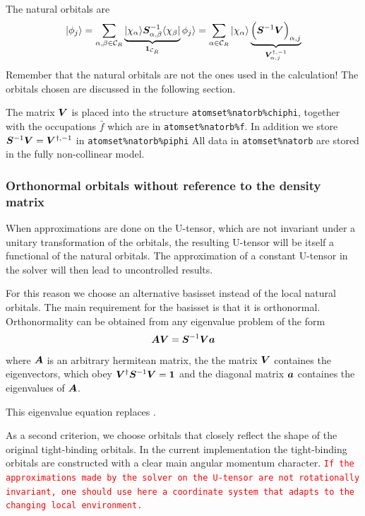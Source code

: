 \documentclass[11pt,a4paper]{report}
\newcommand{\petertt}[1]{\textcolor{red}{\texttt{#1}}}
\begin{document}
The natural orbitals are
\begin{eqnarray}
|\phi_j\rangle=\sum_{\alpha,\beta\in\mathcal{C}_R}
\underbrace{|\chi_\alpha\rangle
\bm{S}^{-1}_{\alpha,\beta}\langle\chi_\beta|}_{\bm{1}_{\mathcal{C}_R}}
\phi_j\rangle
=\sum_{\alpha\in\mathcal{C}_R}|\chi_\alpha\rangle
\underbrace{\Bigl(\bm{S}^{-1}\bm{V}\Bigr)_{\alpha,j}}_{\bm{V}^{\dagger,-1}_{\alpha,j}}
\end{eqnarray}
Remember that the natural orbitals are not the ones used in the
calculation! The orbitals chosen are discussed in the following
section.


The matrix $\bm{V}$ is placed into the structure
\verb|atomset%natorb%chiphi|, together with the occupations $\bar{f}$
which are in \verb|atomset%natorb%f|. In addition we store
$\bm{S}^{-1}\bm{V}=\bm{V}^{\dagger,-1}$ in
\verb|atomset%natorb%piphi| All data in \verb|atomset%natorb| are
stored in the fully non-collinear model.

\subsubsection{Orthonormal orbitals without reference to the density matrix}
When approximations are done on the U-tensor, which are not invariant
under a unitary transformation of the orbitals, the resulting U-tensor
will be itself a functional of the natural orbitals. The approximation
of a constant U-tensor in the solver will then lead to uncontrolled
results.

For this reason we choose an alternative basisset instead of the local
natural orbitals. The main requirement for the basisset is that it is
orthonormal.  Orthonormality can be obtained from any eigenvalue
problem of the form
\begin{eqnarray}
\bm{A}\bm{V}=\bm{S}^{-1}\bm{V}\bm{a}
\end{eqnarray}
where $\bm{A}$ is an arbitrary hermitean matrix, the the matrix
$\bm{V}$ containes the eigenvectors, which obey
$\bm{V}^\dagger\bm{S}^{-1}\bm{V}=\bm{1}$ and the diagonal matrix
$\bm{a}$ containes the eigenvalues of $\bm{A}$.

This eigenvalue equation replaces .

As a second criterion, we choose orbitals that closely reflect the
shape of the original tight-binding orbitals. In the current
implementation the tight-binding orbitals are constructed with a clear
main angular momentum character. \petertt{If the approximations made
  by the solver on the U-tensor are not rotationally invariant, one
  should use here a coordinate system that adapts to the changing
  local environment.}
\end{document}
